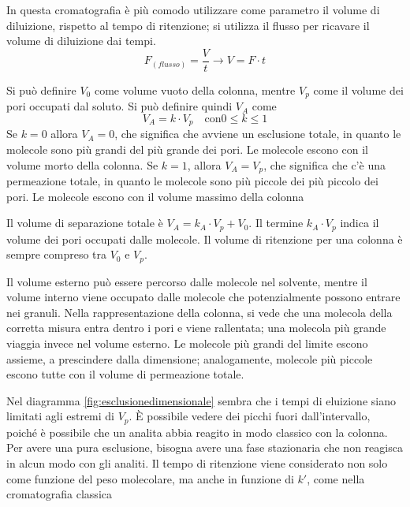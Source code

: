 
In questa cromatografia è più comodo utilizzare come parametro il volume di diluizione, rispetto al tempo di ritenzione; si utilizza il flusso per ricavare il volume di diluizione dai tempi.
\[
F_{(flusso)} = \frac{V}{t} \rightarrow V = F \cdot t
\]

Si può definire $V_0$ come volume vuoto della colonna, mentre $V_p$ come il volume dei pori occupati dal soluto. Si può definire quindi $V_A$ come
\[
V_A = k \cdot V_p \quad \text{con} 0 \leq k \leq 1
\]
Se $k=0$ allora $V_A=0$, che significa che avviene un esclusione totale, in quanto le molecole sono più grandi del più grande dei pori. Le molecole escono con il volume morto della colonna. Se $k=1$, allora $V_A = V_p$, che significa che c'è una permeazione totale, in quanto le molecole sono più piccole dei più piccolo dei pori. Le molecole escono con il volume massimo della colonna


Il volume di separazione totale è $V_A = k_A \cdot V_p + V_0$. Il termine $k_A \cdot V_p$ indica il volume dei pori occupati dalle molecole. Il volume di ritenzione per una colonna è sempre compreso tra $V_0$ e $V_p$.

Il volume esterno può essere percorso dalle molecole nel solvente, mentre il volume interno viene occupato dalle molecole che potenzialmente possono entrare nei granuli. Nella rappresentazione della colonna, si vede che una molecola della corretta misura entra dentro i pori e viene rallentata; una molecola più grande viaggia invece nel volume esterno. Le molecole più grandi del limite escono assieme, a prescindere dalla dimensione; analogamente, molecole più piccole escono tutte con il volume di permeazione totale.


Nel diagramma \ref{fig:esclusionedimensionale} sembra che i tempi di eluizione siano limitati agli estremi di $V_p$. È possibile vedere dei picchi fuori dall'intervallo, poiché è possibile che un analita abbia reagito in modo classico con la colonna. Per avere una pura esclusione, bisogna avere una fase stazionaria che non reagisca in alcun modo con gli analiti. Il tempo di ritenzione viene considerato non solo come funzione del peso molecolare, ma anche in funzione di $k'$, come nella cromatografia classica

